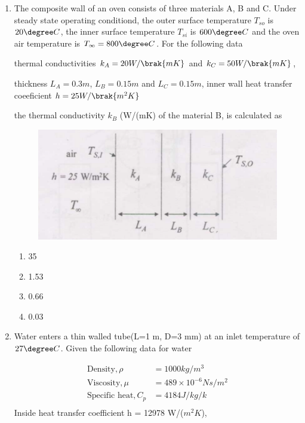 \documentclass[journal,12pt,onecolumn]{IEEEtran}
\theoremstyle{remark}
\begin{document}
\begin{enumerate}
    \item The composite wall of an oven consists of three materials A, B and C. Under steady state operating conditiond, the outer surface temperature $T_{so}$ is $20\degree C$, the inner surface temperature $T_{si}$ is $600\degree C$ and the oven air temperature is $T_\infty = 800\degree C$. For the following data 

    thermal conductivities $k_A=20 W/\brak{mK}$ and $k_C=50W/\brak{mK}$,

    thickness $L_A=0.3m$, $L_B=0.15m$ and $L_C=0.15m$,
    inner wall heat transfer coeeficient $h=25W/\brak{m^2K}$

    the thermal conductivity $k_B$ (W/(mK) of the material B, is calculated as 

    \begin{figure}[H]
        \centering
        \includegraphics[width=0.5\columnwidth]{figs/42.png}
        \caption{}
        \label{fig:42}
    \end{figure}

\begin{multicols}{4}
    \begin{enumerate}
        \item 35
        \item 1.53
        \item 0.66
        \item 0.03
    \end{enumerate}
\end{multicols}
    
    \item Water enters a thin walled tube(L=1 m, D=3 mm) at an inlet temperature of $27\degree C$. Given the following data for water

    \begin{align*}
        \text{Density}, \rho &= 1000 kg/m^3 \\
        \text{Viscosity}, \mu &= 489\times 10^{-6} Ns/m^2 \\
        \text{Specific heat}, C_p &= 4184 J/kg/k \\
    \end{align*}
    Inside heat transfer coefficient h = 12978 W/($m^2K$),
    

\end{enumerate}
\end{document}
